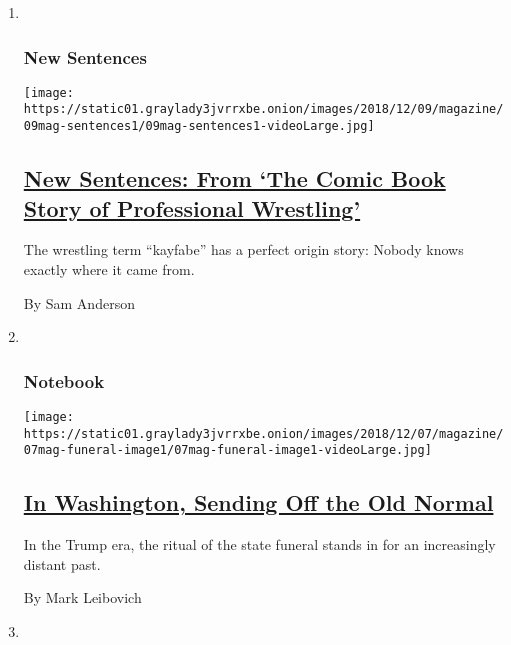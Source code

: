 \begin{enumerate}
\def\labelenumi{\arabic{enumi}.}
\item ~
  \hypertarget{new-sentences}{%
  \subsubsection{New Sentences}\label{new-sentences}}

  \texttt{[image: https://static01.graylady3jvrrxbe.onion/images/2018/12/09/magazine/09mag-sentences1/09mag-sentences1-videoLarge.jpg]}

  \hypertarget{new-sentences-from-the-comic-book-story-of-professional-wrestling}{%
  \subsection{\texorpdfstring{\href{/2018/12/06/magazine/new-sentences-from-the-comic-book-story-of-professional-wrestling.html}{New
  Sentences: From `The Comic Book Story of Professional
  Wrestling'}}{New Sentences: From `The Comic Book Story of Professional Wrestling'}}\label{new-sentences-from-the-comic-book-story-of-professional-wrestling}}

  The wrestling term ``kayfabe'' has a perfect origin story: Nobody
  knows exactly where it came from.

  By Sam Anderson
\item ~
  \hypertarget{notebook}{%
  \subsubsection{Notebook}\label{notebook}}

  \texttt{[image: https://static01.graylady3jvrrxbe.onion/images/2018/12/07/magazine/07mag-funeral-image1/07mag-funeral-image1-videoLarge.jpg]}

  \hypertarget{in-washington-sending-off-the-old-normal}{%
  \subsection{\texorpdfstring{\href{/2018/12/07/magazine/in-washington-sending-off-the-old-normal.html}{In
  Washington, Sending Off the Old
  Normal}}{In Washington, Sending Off the Old Normal}}\label{in-washington-sending-off-the-old-normal}}

  In the Trump era, the ritual of the state funeral stands in for an
  increasingly distant past.

  By Mark Leibovich
\item ~
  \hypertarget{on-medicine}{%
}
\end{enumerate}
